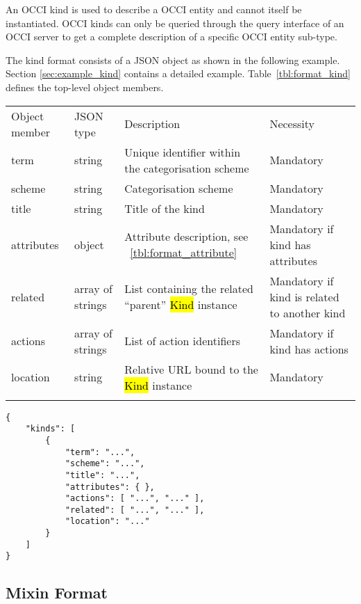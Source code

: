 \documentclass[10pt,a4paper]{article}
\begin{document}
An OCCI kind is used to describe a OCCI entity and cannot itself be 
instantiated. OCCI kinds can only be queried through the query interface 
of an OCCI server to get a complete description of a specific OCCI entity sub-type.

The kind format consists of a JSON object as shown in the
following example. Section \ref{sec:example_kind} contains a detailed example.
Table~\ref{tbl:format_kind} defines the top-level object members.

 {
    \begin{tabular}{llll}
    \toprule
    Object member & JSON type & Description & Necessity\\
    \colrule
    term & string & Unique identifier within the categorisation scheme & Mandatory\\
    scheme & string & Categorisation scheme & Mandatory\\
    title & string & Title of the kind & Mandatory\\
    attributes & object & Attribute description, see ~\ref{tbl:format_attribute} & Mandatory if kind has attributes\\
    related & array of strings & List containing the related ``parent'' \hl{Kind} instance & Mandatory if kind is related to another kind\\
    actions & array of strings & List of action identifiers & Mandatory if kind has actions\\
    location & string & Relative URL bound to the \hl{Kind} instance & Mandatory\\
    \botrule
    \end{tabular}
}

\begin{verbatim}
{
    "kinds": [
        {
            "term": "...",
            "scheme": "...",
            "title": "...",
            "attributes": { },
            "actions": [ "...", "..." ],
            "related": [ "...", "..." ],
            "location": "..."
        }
    ]
}
\end{verbatim}

\subsection{Mixin Format}
\label{sec:format_mixin}
\end{document}
